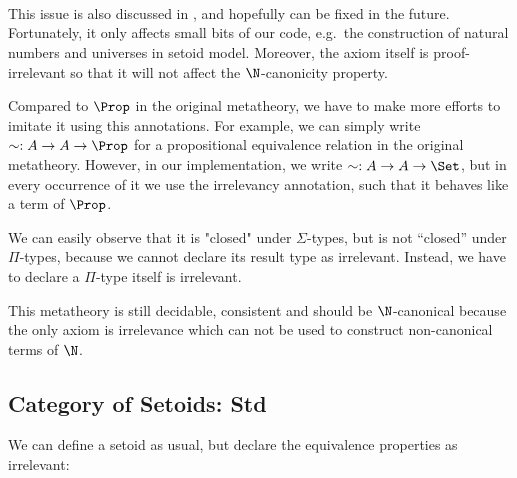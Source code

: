 \begin{code}\>\<%
\\
\>\<%
\\
\>[0]\<[4]%
\>[4] \AgdaSymbol{:} \AgdaSymbol{\{} \AgdaSymbol{:} \AgdaSymbol{\}}    \<%
\\
\>\<\end{code}

This issue is also discussed in \cite{prAgda}, and hopefully can be fixed in the future.
Fortunately, it only affects small bits of our code, e.g.\ the construction of natural numbers and universes in setoid model.
Moreover, the axiom itself is proof-irrelevant so that it will not affect the $\N$-canonicity property.

Compared to $\Prop$ in the original metatheory, we have to make more efforts to imitate it using this annotations. For example, we can simply write $\sim : A \to A \to \Prop$ for a propositional equivalence relation in the original metatheory. However, in our implementation, we write $\sim : A \to A \to \Set$, but in every occurrence of it we use the irrelevancy annotation, such that it behaves like a term of $\Prop$. 

We can easily observe that it is "closed" under $\Sigma$-types, but is not ``closed'' under $\Pi$-types, because we cannot declare its result type as irrelevant. Instead, we have to declare a $\Pi$-type itself is irrelevant.

This metatheory is still decidable, consistent and should be $\N$-canonical because the only axiom is irrelevance which can not be used to construct non-canonical terms of $\N$.

\subsection{Category of Setoids: \textbf{Std}}

We can define a setoid as usual, but declare the equivalence properties as irrelevant:

